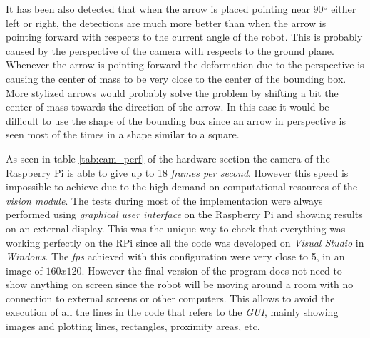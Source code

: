 It has been also detected that when the arrow is placed pointing near $90º$ either left or right, the detections are much more better than when the arrow is pointing forward with respects to the current angle of the robot. This is probably caused by the perspective of the camera with respects to the ground plane. Whenever the arrow is pointing forward the deformation due to the perspective is causing the center of mass to be very close to the center of the bounding box. More stylized arrows would probably solve the problem by shifting a bit the center of mass towards the direction of the arrow. In this case it would be difficult to use the shape of the bounding box since an arrow in perspective is seen most of the times in a shape similar to a square.

As seen in table \ref{tab:cam_perf} of the hardware section the camera of the Raspberry Pi is able to give up to 18 \textit{frames per second}. However this speed is impossible to achieve due to the high demand on computational resources of the \textit{vision module}. The tests during most of the implementation were always performed using \textit{graphical user interface} on the Raspberry Pi and showing results on an external display. This was the unique way to check that everything was working perfectly on the RPi since all the code was developed on \textit{Visual Studio} in \textit{Windows}. The \textit{fps} achieved with this configuration were very close to 5, in an image of $160x120$. However the final version of the program does not need to show anything on screen since the robot will be moving around a room with no connection to external screens or other computers. This allows to avoid the execution of all the lines in the code that refers to the \textit{GUI}, mainly showing images and plotting lines, rectangles, proximity areas, etc. 

